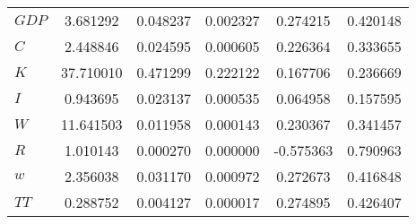 \begin{center}
\begin{longtable}{lccccc}
$GDP       $	 & 	        3.681292	 & 	        0.048237	 & 	        0.002327	 & 	        0.274215	 & 	        0.420148 \\ 
$C         $	 & 	        2.448846	 & 	        0.024595	 & 	        0.000605	 & 	        0.226364	 & 	        0.333655 \\ 
$K         $	 & 	       37.710010	 & 	        0.471299	 & 	        0.222122	 & 	        0.167706	 & 	        0.236669 \\ 
$I         $	 & 	        0.943695	 & 	        0.023137	 & 	        0.000535	 & 	        0.064958	 & 	        0.157595 \\ 
$W         $	 & 	       11.641503	 & 	        0.011958	 & 	        0.000143	 & 	        0.230367	 & 	        0.341457 \\ 
$R         $	 & 	        1.010143	 & 	        0.000270	 & 	        0.000000	 & 	       -0.575363	 & 	        0.790963 \\ 
$w         $	 & 	        2.356038	 & 	        0.031170	 & 	        0.000972	 & 	        0.272673	 & 	        0.416848 \\ 
$TT        $	 & 	        0.288752	 & 	        0.004127	 & 	        0.000017	 & 	        0.274895	 & 	        0.426407 \\ 
\end{longtable}
 \end{center}

